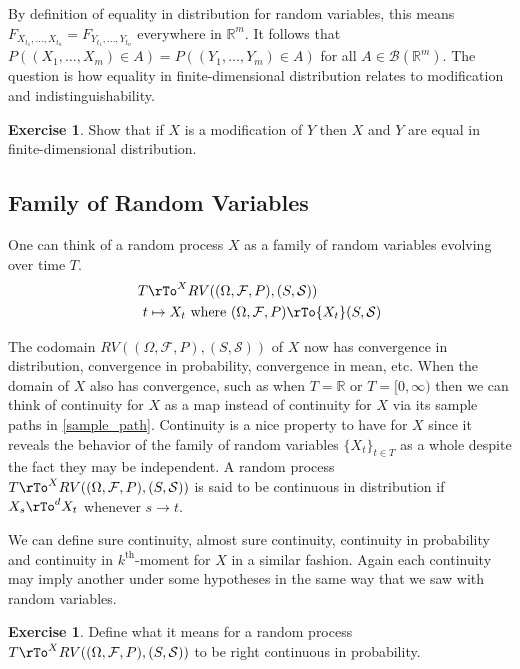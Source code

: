 \documentclass[12pt]{amsart}
\theoremstyle{definition}
\newtheorem{exercise}[theorem]{Exercise}
\begin{document}
By definition of equality in distribution for random variables, this means $F_{X_{t_1}, \dots , X_{t_n}} = F_{Y_{t_1}, \dots , Y_{t_n}}$ everywhere in $\mathbb{R}^m$. It follows that $P((X_1, \dots , X_m) \in A) = P((Y_1, \dots , Y_m) \in A)$ for all $A \in \mathcal{B}(\mathbb{R}^m)$. The question is how equality in finite-dimensional distribution relates to modification and indistinguishability.

\begin{exercise} Show that if $X$ is a modification of $Y$ then $X$ and $Y$ are equal in finite-dimensional distribution.
\end{exercise}

\subsection{Family of Random Variables} One can think of a random process $X$ as a family of random variables evolving over time $T$.
\begin{align*}
T & \rTo^X RV((\Omega, \mathcal{F}, P), (S, \mathcal{S})) \\
t & \mapsto X_t \text{ where } (\Omega, \mathcal{F}, P) \rTo{X_t} (S, \mathcal{S})
\end{align*}

The codomain $RV((\Omega, \mathcal{F}, P), (S, \mathcal{S}))$ of $X$ now has convergence in distribution, convergence in probability, convergence in mean, etc. When the domain of $X$ also has convergence, such as when $T = \mathbb{R}$ or $T = [0, \infty)$ then we can think of continuity for $X$ as a map instead of continuity for $X$ via its sample paths in \ref{sample_path}. Continuity is a nice property to have for $X$ since it reveals the behavior of the family of random variables $\{X_t\}_{t \in T}$ as a whole despite the fact they may be independent.
\dfn\label{continuous_process1} A random process $T \rTo^X RV((\Omega, \mathcal{F}, P),(S, \mathcal{S}))$ is said to be continuous in distribution if $X_s \rTo^d X_t$ whenever $s \to t$.

We can define sure continuity, almost sure continuity, continuity in probability and continuity in $k^{\text{th}}$-moment for $X$ in a similar fashion. Again each continuity may imply  another under some hypotheses in the same way that we saw with random variables.

\begin{exercise} Define what it means for a random process $T \rTo^X RV((\Omega, \mathcal{F}, P),(S, \mathcal{S}))$ to be right continuous in probability.
\end{exercise}
\end{document}
